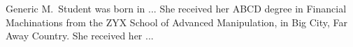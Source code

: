 

Generic M.\ Student was born in ... 
She received her ABCD degree in Financial Machinations from the ZYX
School of Advanced Manipulation, in Big City, Far Away Country.
She received her ...
